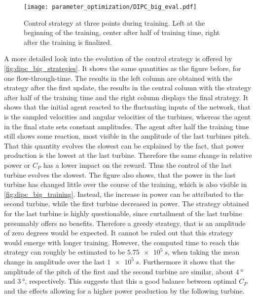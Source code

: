 \begin{figure}[h]
	\centering
	\texttt{[image: parameter\_optimization/DIPC\_big\_eval.pdf]}
	\caption{ Control strategy at three points during training. Left at the beginning of the training, center after half of training time, right after the training is finalized.}
	\label{fig:dipc_big_strategies}
\end{figure}
A more detailed look into the evolution of the control strategy is offered by \autoref{fig:dipc_big_strategies}. It shows the same quantities as the figure before, for one flow-through-time. The results in the left column are obtained with the strategy after the first update, the results in the central column with the strategy after half of the training time and the right column displays the final strategy. It shows that the initial agent reacted to the fluctuating inputs of the network, that is the sampled velocities and angular velocities of the turbines, whereas the agent in the final state sets constant amplitudes. The agent after half the training time still shows some reaction, most visible in the amplitude of the last turbines pitch. That this quantity evolves the slowest can be explained by the fact, that power production is the lowest at the last turbine. Therefore the same change in relative power or $C_P$ has a lower impact on the reward. Thus the control of the last turbine evolves the slowest. The figure also shows, that the power in the last turbine has changed little over the course of the training, which is also visible in \autoref{fig:dipc_big_training}. Instead, the increase in power can be attributed to the second turbine, while the first turbine decreased in power. The strategy obtained for the last turbine is highly questionable, since curtailment of the last turbine presumably offers no benefits. Therefore a greedy strategy, that is an amplitude of zero degrees would be expected. It cannot be ruled out that this strategy would emerge with longer training. However, the computed time to reach this strategy can roughly be estimated to be $\SI{5.75e5}{s}$, when taking the mean change in amplitude over the last $\SI{1e5}{s}$. Furthermore it shows that the amplitude of the pitch of the first and the second turbine are similar, about $\SI{4}{\degree}$ and $\SI{3}{\degree}$, respectively. This suggests that this a good balance between optimal $C_P$ and the effects allowing for a higher power production by the following turbine.
